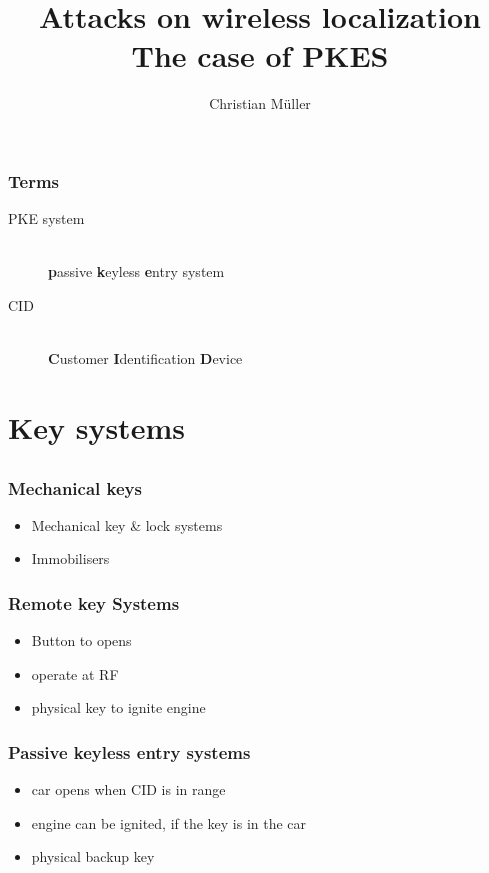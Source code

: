 \documentclass[12pt]{beamer}
\title{Attacks on wireless localization\\ The case of PKES}
\author{Christian Müller}
\begin{document}
	\begin{frame}
		\titlepage
	\end{frame}

	\begin{frame}
		\tableofcontents
	\end{frame}

	\begin{frame}
		\frametitle{Terms}
			\begin{description}
				\item[PKE system]\hfill \\
						\textbf{p}assive \textbf{k}eyless \textbf{e}ntry system
				\item[CID] \hfill \\
					\textbf{C}ustomer \textbf{I}dentification \textbf{D}evice
			\end{description}
	\end{frame}
	
\section{Key systems}
\subsection*{}
	\begin{frame}
		\frametitle{Mechanical keys}
		\begin{itemize}
			\onslide<1-2>			
			\item Mechanical key \& lock systems
			\onslide<2-2>
			\item Immobilisers
		\end{itemize}
	\end{frame}
	
	\begin{frame}
		\frametitle{Remote key Systems}
		\begin{itemize}
			\item Button to opens
			\item operate at RF 	%
			\item physical key to ignite engine
		\end{itemize}
	\end{frame}

	\begin{frame}
		\frametitle{Passive keyless entry systems}
		\begin{itemize}
			\item car opens when CID is in range
			\item engine can be ignited, if the key is in the car
			\item physical backup key
		\end{itemize}
	\end{frame}
\end{document}
